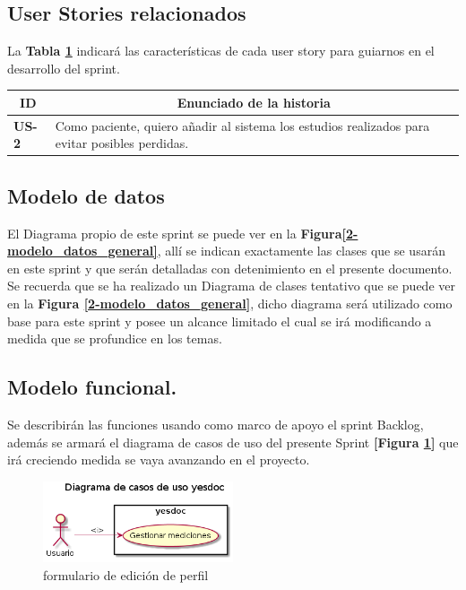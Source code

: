 \documentclass[a4paper,12pt]{article}
\begin{document}
\subsection{User Stories relacionados}
La \textbf{Tabla \ref{US-Sprint3} } indicará las características de cada user story para guiarnos en el desarrollo del sprint.
\begin{table}[h]
    \label{US-Sprint3}
    \centering
	\begin{tabular}{|l|p{9cm}|}
	\hline
        \multicolumn{1}{|c|}{\textbf{ID}} &
        \multicolumn{1}{|c|}{\textbf{Enunciado de la historia}} \\          
    \hline
        \textbf{US-2 } & Como paciente, quiero añadir al sistema los estudios realizados para evitar posibles perdidas.\\
     \hline 
     
    \end{tabular}
\end{table}

\subsection{Modelo de datos}
El Diagrama propio de este sprint se puede ver en la \textbf{Figura\ref{2-modelo_datos_general}}, allí se indican exactamente las clases que se usarán en este sprint y que serán detalladas con detenimiento en el presente documento. Se recuerda que se ha realizado un Diagrama de clases tentativo que se puede ver en la \textbf{Figura \ref{2-modelo_datos_general}}, dicho diagrama  será utilizado como base para este sprint y posee un alcance limitado el cual se irá modificando a medida que se profundice en los temas.




\subsection{ Modelo funcional.} %
Se describirán las funciones usando como marco de apoyo el sprint Backlog, además se armará el diagrama de casos de uso del presente Sprint \textbf{[Figura \ref{2-caso_de_uso}]} que irá creciendo  medida se vaya avanzando en el proyecto.


    \begin{figure}[h]
        \centering
        \includegraphics[width=0.5\textwidth]{img/2-caso_de_uso}
        \caption{formulario de edición de perfil}
		\label{2-caso_de_uso}
    \end{figure}
\end{document}
